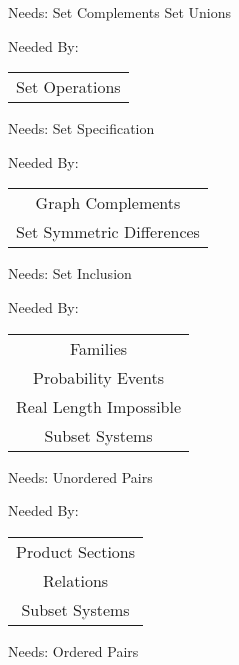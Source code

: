 \newpage
\label{set_symmetric_differences}


\clearpage
Needs:  Set Complements  Set Unions 

Needed By: \begin{tabular}{c} Set Operations \\ 
\end{tabular}
\clearpage{}

\newpage
\label{set_complements}


\clearpage
Needs:  Set Specification 

Needed By: \begin{tabular}{c} Graph Complements \\  Set Symmetric Differences \\ 
\end{tabular}
\clearpage{}

\newpage
\label{power_set}


\clearpage
Needs:  Set Inclusion 

Needed By: \begin{tabular}{c} Families \\  Probability Events \\  Real Length Impossible \\  Subset Systems \\ 
\end{tabular}
\clearpage{}

\newpage
\label{ordered_pairs}


\clearpage
Needs:  Unordered Pairs 

Needed By: \begin{tabular}{c} Product Sections \\  Relations \\  Subset Systems \\ 
\end{tabular}
\clearpage{}

\newpage
\label{relations}


\clearpage
Needs:  Ordered Pairs 

